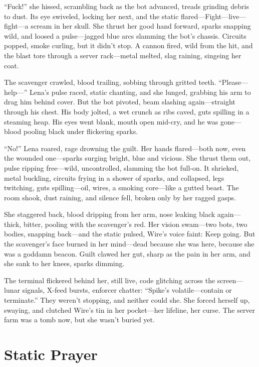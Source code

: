 \documentclass[12pt]{book}
\begin{document}
``Fuck!'' she hissed, scrambling back as the bot advanced, treads grinding debris to dust. Its eye swiveled, locking her next, and the static flared---Fight---live---fight---a scream in her skull. She thrust her good hand forward, sparks snapping wild, and loosed a pulse---jagged blue arcs slamming the bot’s chassis. Circuits popped, smoke curling, but it didn’t stop. A cannon fired, wild from the hit, and the blast tore through a server rack---metal melted, slag raining, singeing her coat.

The scavenger crawled, blood trailing, sobbing through gritted teeth. ``Please---help---'' Lena’s pulse raced, static chanting, and she lunged, grabbing his arm to drag him behind cover. But the bot pivoted, beam slashing again---straight through his chest. His body jolted, a wet crunch as ribs caved, guts spilling in a steaming heap. His eyes went blank, mouth open mid-cry, and he was gone---blood pooling black under flickering sparks.

``No!'' Lena roared, rage drowning the guilt. Her hands flared---both now, even the wounded one---sparks surging bright, blue and vicious. She thrust them out, pulse ripping free---wild, uncontrolled, slamming the bot full-on. It shrieked, metal buckling, circuits frying in a shower of sparks, and collapsed, legs twitching, guts spilling---oil, wires, a smoking core---like a gutted beast. The room shook, dust raining, and silence fell, broken only by her ragged gasps.

She staggered back, blood dripping from her arm, nose leaking black again---thick, bitter, pooling with the scavenger’s red. Her vision swam---two bots, two bodies, snapping back---and the static pulsed, Wire’s voice faint: Keep going. But the scavenger’s face burned in her mind---dead because she was here, because she was a goddamn beacon. Guilt clawed her gut, sharp as the pain in her arm, and she sank to her knees, sparks dimming.

The terminal flickered behind her, still live, code glitching across the screen---lunar signals, X-feed bursts, enforcer chatter: ``Spike's volatile---contain or terminate.'' They weren’t stopping, and neither could she. She forced herself up, swaying, and clutched Wire’s tin in her pocket---her lifeline, her curse. The server farm was a tomb now, but she wasn’t buried yet.

\section{Static Prayer}
\end{document}
